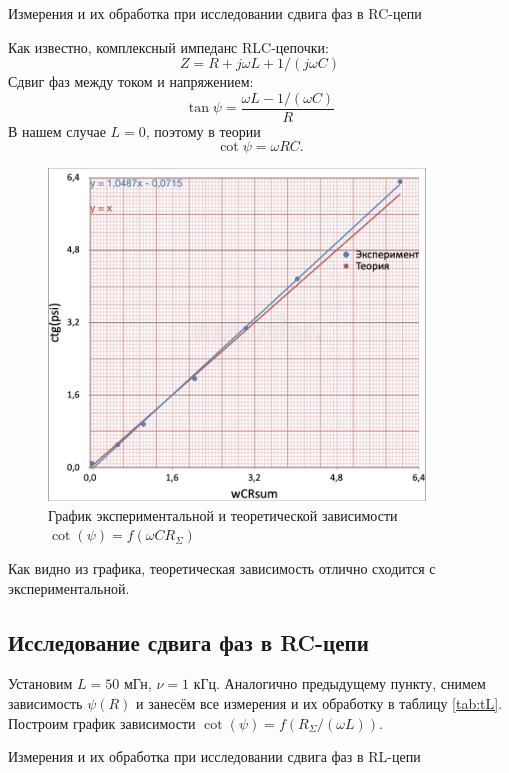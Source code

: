 \documentclass[12pt,a4paper]{article}
\begin{document}
\begin{table}[H]
	\caption{Измерения и их обработка при исследовании сдвига фаз в RC-цепи}
	
	\label{tab:tC}
\end{table}

Как известно, комплексный импеданс RLC-цепочки:
$$ Z = R + j\omega L + 1/(j \omega C)$$
Сдвиг фаз между током и напряжением:
$$\tan \psi = \frac{\omega L - 1/(\omega C)}{R}$$
В нашем случае $L=0$, поэтому в теории
$$\cot \psi = \omega R C.$$

    \begin{figure}[h!]
    	\centering
    	\includegraphics[width=10cm]{src/RC.png}
    	\caption{График экспериментальной и теоретической зависимости $\cot(\psi)=f\left( \omega C R_\Sigma \right)$}
    	\label{fig:plRC}
    \end{figure}

Как видно из графика, теоретическая зависимость отлично сходится с экспериментальной.

\subsection*{Исследование сдвига фаз в RC-цепи}

Установим $L = 50$ мГн, $\nu = 1$ кГц. Аналогично предыдущему пункту, снимем зависимость $\psi(R)$ и занесём все измерения и их обработку в таблицу \ref{tab:tL}. Построим график зависимости $\cot(\psi)=f\left( R_\Sigma/(\omega L) \right)$.

\begin{table}[H]
	\caption{Измерения и их обработка при исследовании сдвига фаз в RL-цепи}
	
	\label{tab:tL}
\end{table}
\end{document}
